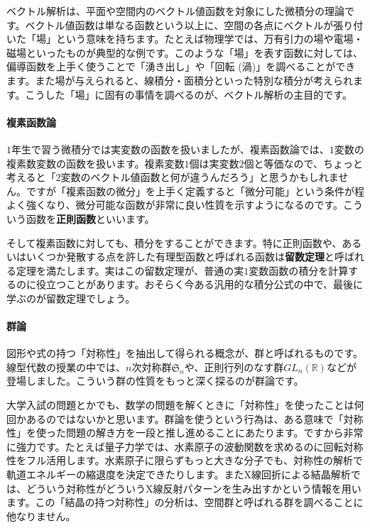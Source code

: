 ベクトル解析は、平面や空間内のベクトル値函数を対象にした微積分の理論です。ベクトル値函数は単なる函数という以上に、空間の各点にベクトルが張り付いた「場」という意味を持ちます。たとえば物理学では、万有引力の場や電場・磁場といったものが典型的な例です。このような「場」を表す函数に対しては、偏導函数を上手く使うことで「湧き出し」や「回転 (渦)」を調べることができます。また場が与えられると、線積分・面積分といった特別な積分が考えられます。こうした「場」に固有の事情を調べるのが、ベクトル解析の主目的です。

\paragraph{複素函数論}

$1$年生で習う微積分では実変数の函数を扱いましたが、複素函数論では、$1$変数の複素数変数の函数を扱います。複素変数$1$個は実変数$2$個と等価なので、ちょっと考えると「$2$変数のベクトル値函数と何が違うんだろう」と思うかもしれません。ですが「複素函数の微分」を上手く定義すると「微分可能」という条件が程よく強くなり、微分可能な函数が非常に良い性質を示すようになるのです。こういう函数を\textbf{正則函数}といいます。

そして複素函数に対しても、積分をすることができます。特に正則函数や、あるいはいくつか発散する点を許した有理型函数と呼ばれる函数は\textbf{留数定理}と呼ばれる定理を満たします。実はこの留数定理が、普通の実$1$変数函数の積分を計算するのに役立つことがあります。おそらく今ある汎用的な積分公式の中で、最後に学ぶのが留数定理でしょう。

\paragraph{群論}

図形や式の持つ「対称性」を抽出して得られる概念が、群と呼ばれるものです。線型代数の授業の中では、$n$次対称群$\mathfrak{S}_n$や、正則行列のなす群$GL_n(\mathbb{R})$などが登場しました。こういう群の性質をもっと深く探るのが群論です。

大学入試の問題とかでも、数学の問題を解くときに「対称性」を使ったことは何回かあるのではないかと思います。群論を使うという行為は、ある意味で「対称性」を使った問題の解き方を一段と推し進めることにあたります。ですから非常に強力です。たとえば量子力学では、水素原子の波動関数を求めるのに回転対称性をフル活用します。水素原子に限らずもっと大きな分子でも、対称性の解析で軌道エネルギーの縮退度を決定できたりします。またX線回折による結晶解析では、どういう対称性がどういうX線反射パターンを生み出すかという情報を用います。この「結晶の持つ対称性」の分析は、空間群と呼ばれる群を調べることに他なりません。

